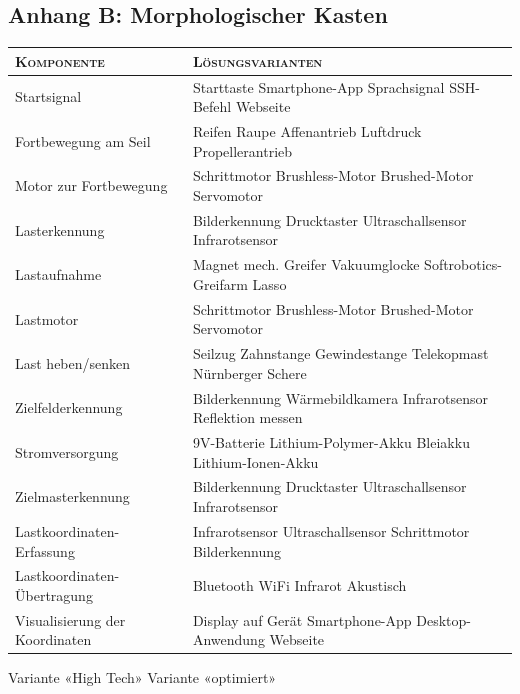\documentclass[a4paper,11pt]{scrartcl}
\begin{document}
\begin{landscape}
\section{Anhang B: Morphologischer Kasten}
\label{lbl:MorphologischerKasten}

\newcommand{\rc}{\textcolor{red}{\large{\checkmark}}}
\newcommand{\gc}{\textcolor{green}{\large{\checkmark}}}

\def\arraystretch{1.5}
\begin{tabularx}{\hsize}{|X|p{15cm}|}
\hline
\large{\textsc{Komponente}} & \large{\textsc{Lösungsvarianten}} \\
\hline
Startsignal & Starttaste \hfill \gc Smartphone-App \hfill \rc Sprachsignal \hfill SSH-Befehl \hfill Webseite \\
Fortbewegung am Seil & \gc Reifen \hfill Raupe \hfill \rc Affenantrieb \hfill Luftdruck \hfill Propellerantrieb \\
Motor zur Fortbewegung & \rc \gc Schrittmotor \hfill Brushless-Motor \hfill Brushed-Motor \hfill Servomotor \\
Lasterkennung & \rc \gc Bilderkennung \hfill Drucktaster \hfill Ultraschallsensor \hfill Infrarotsensor \\
Lastaufnahme & Magnet \hfill mech. Greifer \hfill Vakuumglocke \hfill \rc \gc Softrobotics-Greifarm \hfill Lasso \\
Lastmotor & \rc \gc Schrittmotor \hfill Brushless-Motor \hfill Brushed-Motor \hfill Servomotor \\
Last heben/senken & \gc Seilzug \hfill Zahnstange \hfill Gewindestange \hfill \rc Telekopmast \hfill Nürnberger Schere \\
Zielfelderkennung & \gc Bilderkennung \hfill \rc Wärmebildkamera \hfill Infrarotsensor \hfill Reflektion messen \\
Stromversorgung & 9V-Batterie \hfill \gc Lithium-Polymer-Akku \hfill Bleiakku \hfill \rc Lithium-Ionen-Akku \\
Zielmasterkennung & \rc Bilderkennung \hfill \gc Drucktaster \hfill Ultraschallsensor \hfill Infrarotsensor \\
Lastkoordinaten-Erfassung & Infrarotsensor \hfill \gc Ultraschallsensor \hfill Schrittmotor \hfill \rc Bilderkennung \\
Lastkoordinaten-Übertragung & Bluetooth \hfill \gc WiFi \hfill Infrarot \hfill \rc Akustisch \\
Visualisierung der Koordinaten & Display auf Gerät \hfill \gc Smartphone-App \hfill \rc Desktop-Anwendung \hfill Webseite \\
\hline
\end{tabularx}
\rc Variante «High Tech» \hfill \gc Variante «optimiert»

\end{landscape}

\pagestyle{plain}

\newpage

\listoffigures
\end{document}
